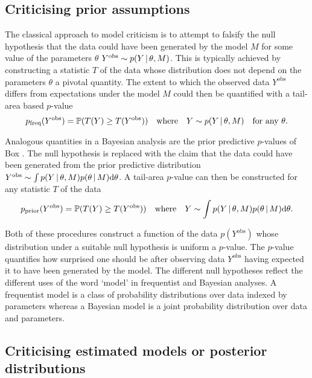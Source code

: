 \subsection{Criticising prior assumptions}

The classical approach to model criticism is to attempt to falsify the null hypothesis that the data could have been generated by the model $M$ for some value of the parameters $\theta$ \ie ${Y^\textrm{obs} \sim p(Y \,|\, \theta, M)}$.
This is typically achieved by constructing a statistic $T$ of the data whose distribution does not depend on the parameters $\theta$ \ie a pivotal quantity.
The extent to which the observed data $Y^\textrm{obs}$ differs from expectations under the model $M$ could then be quantified with a tail-area based $p$-value
\begin{equation}
  p_\textrm{freq}(Y^\textrm{obs}) = \mathbb{P}(T(Y)\geq T(Y^\textrm{obs})) \quad \textrm{where} \quad Y \sim p(Y \,|\, \theta, M) \quad \textrm{for any } \theta.
  \label{eq:freq-p-value}
\end{equation}

Analogous quantities in a Bayesian analysis are the prior predictive $p$-values of Box \citep{Box1980-ud}.
The null hypothesis is replaced with the claim that the data could have been generated from the prior predictive distribution ${Y^\textrm{obs} \sim \int p(Y \,|\, \theta, M)p(\theta \,|\, M) \mathrm{d}\theta}$.
A tail-area $p$-value can then be constructed for any statistic $T$ of the data
\begin{equation}
  p_\textrm{prior}(Y^\textrm{obs}) = \mathbb{P}(T(Y)\geq T(Y^\textrm{obs})) \quad \textrm{where} \quad Y \sim \int p(Y \,|\, \theta, M)p(\theta \,|\, M) \mathrm{d}\theta.
  \label{eq:prior-p-value}
\end{equation}

Both of these procedures construct a function of the data $p(Y^\textrm{obs})$ whose distribution under a suitable null hypothesis is uniform \ie a $p$-value.
The $p$-value quantifies how surprised one should be after observing data $Y^\textrm{obs}$ having expected it to have been generated by the model.
The different null hypotheses reflect the different uses of the word `model' in frequentist and Bayesian analyses.
A frequentist model is a class of probability distributions over data indexed by parameters whereas a Bayesian model is a joint probability distribution over data and parameters.

\subsection{Criticising estimated models or posterior distributions}

